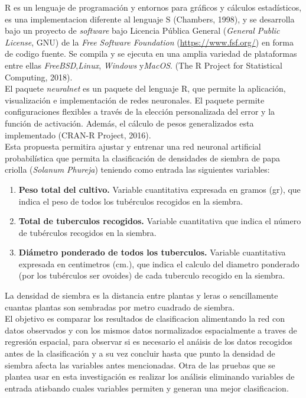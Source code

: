 R es un lenguaje de programación y entornos para gráficos y c\'alculos estad\'isticos, es una implementacion diferente al lenguaje S (Chambers, 1998), y se desarrolla bajo un proyecto de \textit{software} bajo Licencia Pública General (\textit{General Public License}, GNU) de la \textit{Free Software Foundation} (\url{https://www.fsf.org/}) en forma de codigo fuente. Se compila y se ejecuta en una amplia variedad de plataformas entre ellas \textit{FreeBSD},\textit{Linux}, \textit{Windows} y\textit{MacOS}. (The R Project for Statistical Computing, 2018).\\

El paquete \textit{neuralnet} es un paquete del lenguaje R,  que permite la aplicación, visualización e implementación de redes neuronales. El paquete permite configuraciones flexibles a través de la elección personalizada del error y la función de activación. Además, el cálculo de pesos generalizados esta implementado (CRAN-R Project, 2016).\\

Esta propuesta permitira ajustar y entrenar una red neuronal artificial probabil\'istica que permita la clasificación de densidades de siembra de papa criolla (\textit{Solanum Phureja}) teniendo como entrada las siguientes variables: 

\begin{enumerate}
    \item{\textbf{Peso total del cultivo.} Variable cuantitativa expresada en gramos (gr), que indica el peso de todos los tubérculos recogidos en la siembra.}
	\item{\textbf{Total de tuberculos recogidos.} Variable cuantitativa que indica el número de tubérculos recogidos en la siembra.}
	\item{\textbf{Diámetro ponderado de todos los tuberculos.} Variable cuantitativa expresada en centimetros (cm.), que indica el calculo del diametro ponderado (por los tubérculos ser ovoides) de cada tuberculo recogido en la siembra.}
\end{enumerate}

La densidad de siembra es la distancia entre plantas y leras o sencillamente cuantas plantas son sembradas por metro cuadrado de siembra.\\

El objetivo es comparar los resultados de clasificacion alimentando la red con datos observados y con los mismos datos normalizados espacialmente a traves de regresión espacial, para observar si es necesario el anáisis de los datos recogidos antes de la clasificación y a su vez concluir hasta que punto la densidad de siembra afecta las variables antes mencionadas. Otra de las pruebas que se plantea usar en esta investigación es realizar los análisis eliminando variables de entrada atisbando cuales variables permiten y generan una mejor clasificacion.\\

